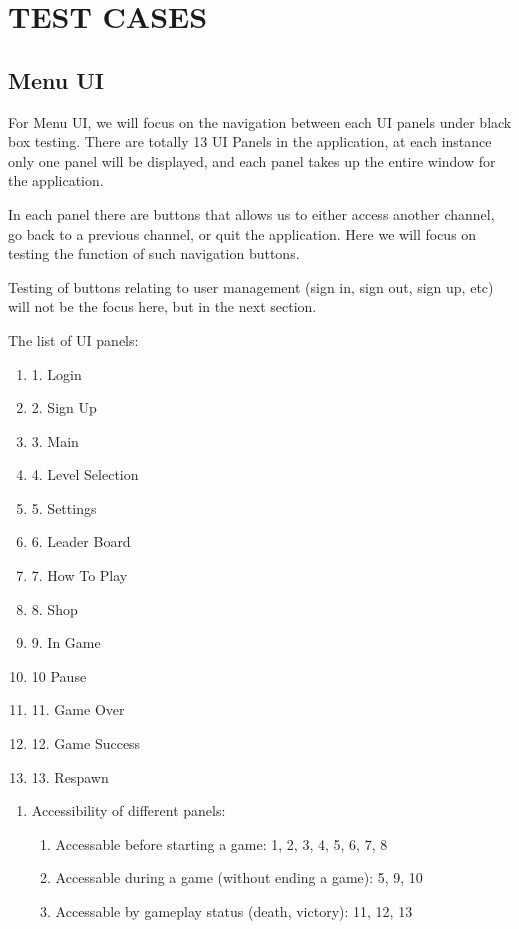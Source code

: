 \documentclass[11pt]{article}
\begin{document}
    \section{TEST CASES}
    
    \subsection{Menu UI}
    For Menu UI, we will focus on the navigation between each UI panels under black box testing. There are totally 13 UI Panels in the application, at each instance only one panel will be displayed, and each panel takes up the entire window for the application.

    In each panel there are buttons that allows us to either access another channel, go back to a previous channel, or quit the application. Here we will focus on testing the function of such navigation buttons. 
    
    Testing of buttons relating to user management (sign in, sign out, sign up, etc) will not be the focus here, but in the next section.
    
    The list of UI panels:
        \begin{enumerate}
            \item 1. Login
            \item 2. Sign Up
            \item 3. Main
            \item 4. Level Selection
            \item 5. Settings
            \item 6. Leader Board
            \item 7. How To Play
            \item 8. Shop
            \item 9. In Game
            \item 10 Pause
            \item 11. Game Over
            \item 12. Game Success
            \item 13. Respawn
        \end{enumerate}    

        \begin{enumerate}
            \item Accessibility of different panels:
            \begin{enumerate}
                \item Accessable before starting a game: 1, 2, 3, 4, 5, 6, 7, 8
                \item Accessable during a game (without ending a game): 5, 9, 10
                \item Accessable by gameplay status (death, victory): 11, 12, 13
            \end{enumerate}
        \end{enumerate}
\end{document}
